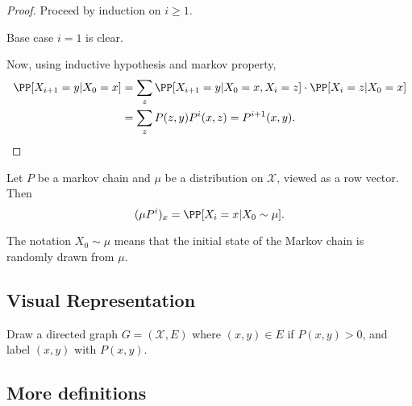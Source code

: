 \begin{proof}
Proceed by induction on $i\geq 1$.

Base case $i=1$ is clear. 

Now, using inductive hypothesis and markov property, 
\begin{align*}
    \PP[X_{i+1}=y|X_0=x] &= \sum_z\PP[X_{i+1}=y|X_0=x, X_i=z]\cdot \PP[X_i=z|X_0=x] \\
    &= \sum_z P(z,y)P^i(x,z) = P^{i+1}(x,y).
\end{align*}
\end{proof}

\begin{theorem}
\lemlabel

Let $P$ be a markov chain and $\mu$ be a distribution on $\mathcal{X}$, viewed as a row vector. Then 
\[(\mu P^i)_x = \PP[X_i=x|X_0\sim \mu]. \]
\end{theorem}

The notation $X_0\sim \mu$ means that the initial state of the Markov chain is randomly drawn from $\mu$. 

\subsection{Visual Representation}

Draw a directed graph $G=(\mathcal{X}, E)$ where $(x,y)\in E$ if $P(x,y) > 0$, and label $(x,y)$ with $P(x,y)$.

\begin{example}

\begin{center}
\end{center}
\end{example}

\subsection{More definitions}

